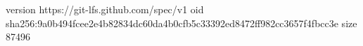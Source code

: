 version https://git-lfs.github.com/spec/v1
oid sha256:9a0b494fcee2e4b82834dc60da4b0cfb5c33392ed8472ff982cc3657f4fbcc3e
size 87496
